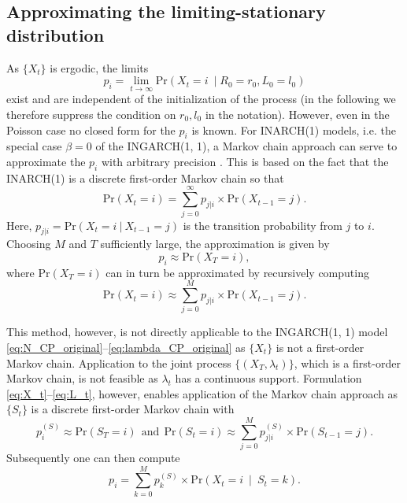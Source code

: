 \documentclass[review]{elsarticle}
\begin{document}
\subsection{Approximating the limiting-stationary distribution}

As $\{X_t\}$ is ergodic, the limits
$$
p_i = \lim_{t \rightarrow \infty} \text{Pr}(X_t = i \ \mid R_0 = r_0, L_0 = l_0)
$$
exist and are independent of the initialization of the process (in the following we therefore suppress the condition on $r_0, l_0$ in the notation). However, even in the Poisson case no closed form for the $p_i$ is known. For INARCH(1) models, i.e. the special case $\beta = 0$ of the INGARCH(1, 1), a Markov chain approach can serve to approximate the $p_i$ with arbitrary precision \cite{Weiss2010}. This is based on the fact that the INARCH(1) is a discrete first-order Markov chain so that
$$
\text{Pr}(X_t = i) = \sum_{j = 0}^\infty p_{j|i} \times \text{Pr}(X_{t - 1} = j).
$$
Here, $p_{j|i} = \text{Pr}(X_t = i \ | \ X_{t - 1} = j) $ is the transition probability from $j$ to $i$. Choosing $M$ and $T$ sufficiently large, the approximation is given by
$$
p_i \approx \text{Pr}(X_T = i),
$$
where $\text{Pr}(X_T = i)$ can in turn be approximated by recursively computing
$$
\text{Pr}(X_t = i) \approx \sum_{j = 0}^M p_{j|i} \times \text{Pr}(X_{t - 1} = j).
$$

This method, however, is not directly applicable to the INGARCH(1, 1) model \eqref{eq:N_CP_original}--\eqref{eq:lambda_CP_original} as $\{X_t\}$ is not a first-order Markov chain. Application to the joint process $\{(X_T, \lambda_t)\}$, which is a first-order Markov chain, is not feasible as $\lambda_t$ has a continuous support. Formulation \eqref{eq:X_t}--\eqref{eq:L_t}, however, enables application of the Markov chain approach as $\{S_t\}$ is a discrete first-order Markov chain with
$$
p^{(S)}_i \approx \text{Pr}(S_T = i) \ \ \text{and} \ \ \text{Pr}(S_t = i) \approx \sum_{j = 0}^M p^{(S)}_{j|i} \times \text{Pr}(S_{t - 1} = j).
$$
Subsequently one can then compute
$$
p_i = \sum_{k = 0}^M p_k^{(S)} \times \text{Pr}(X_t = i \ \mid \ S_t = k).
$$
\end{document}
